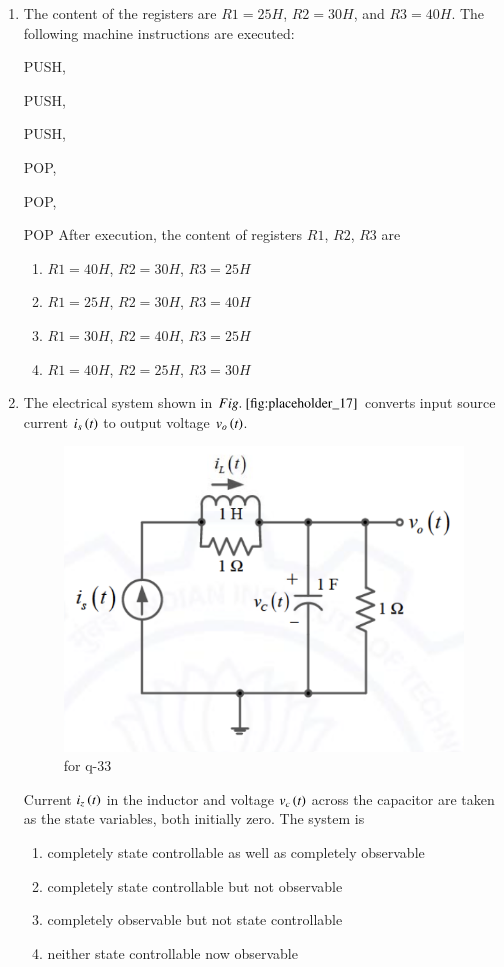 \documentclass[journal,12pt,onecolumn]{IEEEtran}
\theoremstyle{remark}
\begin{document}
\begin{enumerate}
\item The content of the registers are $R1 = 25H$, $R2 = 30H$, and $R3 = 40H$. The following machine instructions are executed:  

PUSH, 

PUSH, 

PUSH, 

POP, 

POP, 

POP  
After execution, the content of registers $R1$, $R2$, $R3$ are
\begin{multicols}{2}
\begin{enumerate}
\item $R1 = 40H$, $R2 = 30H$, $R3 = 25H$
\item $R1 = 25H$, $R2 = 30H$, $R3 = 40H$
\item $R1 = 30H$, $R2 = 40H$, $R3 = 25H$
\item $R1 = 40H$, $R2 = 25H$, $R3 = 30H$
\end{enumerate}
\end{multicols}
\hfill {}

\item The electrical system shown in $\figref{fig:placeholder_17}$ converts input source current $i_s\left(t\right)$ to output voltage $v_o\left(t\right)$.
\begin{figure}[H]
    \centering
    \includegraphics[width=0.4\columnwidth]{figs/17.png}
    \caption{\centering for q-33}
    \label{fig:placeholder_17}
\end{figure}
Current $i_z\left(t\right)$ in the inductor and voltage $v_c\left(t\right)$ across the capacitor are taken as the state variables, both initially zero.  
The system is
\begin{enumerate}
    \item completely state controllable as well as completely observable 
    \item completely state controllable but not observable
    \item completely observable but not state controllable
    \item neither state controllable now observable
\end{enumerate}
\hfill {}


\end{enumerate}
\end{document}
